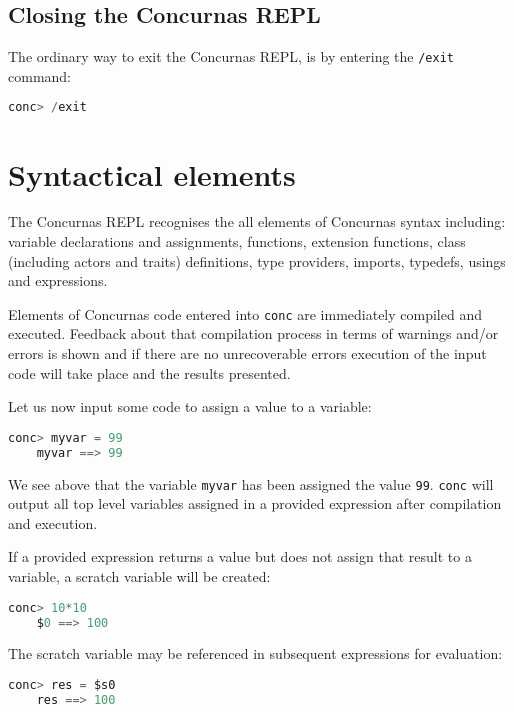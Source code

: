 \documentclass[conc-doc]{subfiles}
\begin{document}
	\subsection{Closing the Concurnas REPL}
	The ordinary way to exit the Concurnas REPL, is by entering the \lstinline{/exit} command:
	
	\begin{lstlisting}[language=C]
	conc> /exit
	\end{lstlisting}
	
	
	\section{Syntactical elements}
	The Concurnas REPL recognises the all elements of Concurnas syntax including: variable declarations and assignments, functions, extension functions, class (including actors and traits) definitions, type providers, imports, typedefs, usings and expressions.
	
	Elements of Concurnas code entered into \lstinline{conc} are immediately compiled and executed. Feedback about that compilation process in terms of warnings and/or errors is shown and if there are no unrecoverable errors execution of the input code will take place and the results presented.
	
	
	Let us now input some code to assign a value to a variable:
	
	\begin{lstlisting}[language=C]
	conc> myvar = 99
	myvar ==> 99
	\end{lstlisting}
	
	We see above that the variable \lstinline{myvar} has been assigned the value \lstinline{99}. \lstinline{conc} will output all top level variables assigned in a provided expression after compilation and execution.
	
	If a provided expression returns a value but does not assign that result to a variable, a scratch variable will be created:
	
	\begin{lstlisting}[language=C]
	conc> 10*10
	$0 ==> 100
	\end{lstlisting}
	
	The scratch variable may be referenced in subsequent expressions for evaluation:
	\begin{lstlisting}[language=C]
	conc> res = $s0
	res ==> 100
	\end{lstlisting}
	
\end{document}
